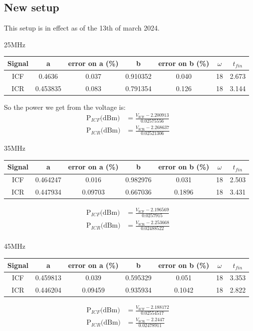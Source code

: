 \documentclass{report}
\begin{document}
\subsection{New setup}
This setup is in effect as of the 13th of march 2024.
\begin{center}
    25MHz
\begin{tabular}{||c c c c c c c||}
 \hline
 Signal & a & error on a (\%) & b & error on b (\%) & $\omega$ & $t_{fin}$\\ [0.5ex]
 \hline\hline
 ICF & 0.4636 & 0.037 & 0.910352 & 0.040 & 18 & 2.673\\
 \hline
 ICR & 0.453835 & 0.083 & 0.791354& 0.126& 18 & 3.144\\
 \hline
\end{tabular}
So the power we get from the voltage is:
\begin{eqnarray}
    \text{P}_{ICF}\text{(dBm)} &= \frac{V_{\text{ICF}}-2.200913}{0.02575556}\\
    \text{P}_{ICR}\text{(dBm)} &= \frac{V_{\text{ICR}}-2.268637}{0.02521306}
\end{eqnarray}


    35MHz
\begin{tabular}{||c c c c c c c||}
 \hline
 Signal & a & error on a (\%) & b & error on b (\%) & $\omega$ & $t_{fin}$\\ [0.5ex]
 \hline\hline
 ICF & 0.464247 & 0.016 & 0.982976 & 0.031 & 18 & 2.503\\
 ICR & 0.447934& 0.09703 & 0.667036& 0.1896& 18 & 3.431\\
 \hline
\end{tabular}
\begin{eqnarray}
    \text{P}_{ICF}\text{(dBm)} &= \frac{V_{\text{ICF}}-2.196569}{0.0257915}\\
    \text{P}_{ICR}\text{(dBm)} &= \frac{V_{\text{ICR}}-2.253668}{0.02488522}\\
\end{eqnarray}

    45MHz
\begin{tabular}{||c c c c c c c||}
 \hline
 Signal & a & error on a (\%) & b & error on b (\%) & $\omega$ & $t_{fin}$\\ [0.5ex]
 \hline\hline
 ICF & 0.459813&  0.039 & 0.595329 & 0.051 & 18 & 3.353\\
 ICR & 0.446204&  0.09459& 0.935934& 0.1042& 18 & 2.822\\
 \hline
\end{tabular}
\begin{eqnarray}
    \text{P}_{ICF}\text{(dBm)} &= \frac{V_{\text{ICF}}-2.188172}{0.02554517}\\
    \text{P}_{ICR}\text{(dBm)} &= \frac{V_{\text{ICR}}-2.2447}{0.02478911}
\end{eqnarray}
\end{center}
\end{document}
